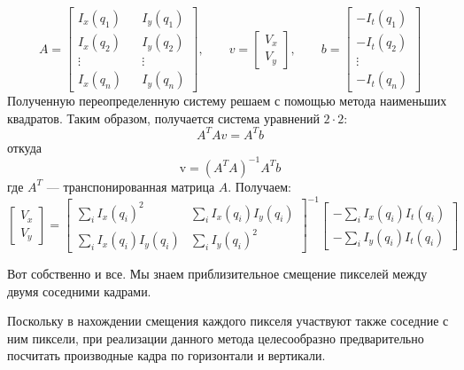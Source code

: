 $$A = \begin{bmatrix}
I_x(q_1) && I_y(q_1) \\
I_x(q_2) && I_y(q_2) \\
\vdots  && \vdots  \\
I_x(q_n) && I_y(q_n)
\end{bmatrix},
\quad\quad
v =
\begin{bmatrix}
V_x\\
V_y
\end{bmatrix},
\quad\quad
b =
\begin{bmatrix}
-I_t(q_1)\\
-I_t(q_2)\\
\vdots \\
-I_t(q_n)
\end{bmatrix} $$
Полученную переопределенную систему решаем с помощью метода наименьших квадратов. Таким образом, получается система уравнений $2 \cdot 2$:
$$A^T A v=A^T b$$
откуда
$$\mathrm{v}=(A^T A)^{-1}A^T b$$
где $A^T$ — транспонированная матрица $A$. Получаем:
$$\begin{bmatrix} V_x\\[10pt] V_y \end{bmatrix} = \begin{bmatrix} \sum_i I_x(q_i)^2 & \sum_i I_x(q_i)I_y(q_i) \\[10pt] \sum_i I_x(q_i)I_y(q_i) & \sum_i I_y(q_i)^2 \end{bmatrix}^{-1} \begin{bmatrix} -\sum_i I_x(q_i)I_t(q_i) \\[10pt] -\sum_i I_y(q_i)I_t(q_i) \end{bmatrix}$$

Вот собственно и все. Мы знаем приблизительное смещение пикселей между двумя соседними кадрами.

Поскольку в нахождении смещения каждого пикселя участвуют также соседние с ним пиксели, при реализации данного метода целесообразно предварительно посчитать производные кадра по горизонтали и вертикали.
